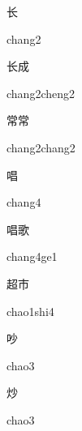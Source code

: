 \begin{verbete}[chang2]{长}
\begin{pronuncia}{chang2}
\end{pronuncia}
\end{verbete}

\begin{verbete}{长成}
\begin{pronuncia}{chang2cheng2}
\end{pronuncia}
\end{verbete}

\begin{verbete}{常常}
\begin{pronuncia}{chang2chang2}
\end{pronuncia}
\end{verbete}

\begin{verbete}[chang4]{唱}
\begin{pronuncia}{chang4}
\end{pronuncia}
\end{verbete}

\begin{verbete}[chang4ge1]{唱歌}
\begin{pronuncia}{chang4ge1}
\end{pronuncia}
\end{verbete}

\begin{verbete}{超市}
\begin{pronuncia}{chao1shi4}
\end{pronuncia}
\end{verbete}

\begin{verbete}[chao3]{吵}
\begin{pronuncia}{chao3}
\end{pronuncia}
\end{verbete}

\begin{verbete}[chao3]{炒}
\begin{pronuncia}{chao3}
\end{pronuncia}
\end{verbete}

